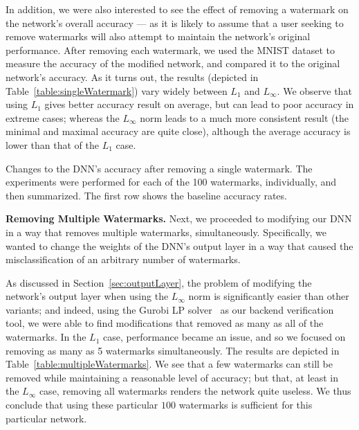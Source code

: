 \documentclass{easychair}
\begin{document}
In addition, we were also interested to see the effect of removing a
watermark on the network's overall accuracy --- as it is likely to
assume that a user seeking to remove watermarks will also attempt to
maintain the network's original performance. After removing each
watermark, we used the MNIST dataset to measure the accuracy of the
modified network, and compared it to the original network's accuracy. As it turns out, the
results (depicted in Table~\ref{table:singleWatermark})
vary widely between $L_1$ and $L_\infty$. We observe that using 
$L_1$ gives better accuracy result on average, but can lead to poor
accuracy in extreme cases; whereas the $L_\infty$ norm leads to a much
more consistent result (the minimal and maximal
accuracy are quite close), although the average accuracy is lower than
that of the $L_1$ case. 

\begin{table}
\caption{Changes to the DNN's accuracy after removing a single
  watermark. The experiments were performed for each of the
  100 watermarks, individually, and then summarized. The first row
  shows the baseline accuracy rates.}
\label{table:singleWatermark}
\end{table}

\medskip\noindent \textbf{Removing Multiple Watermarks.}
Next, we proceeded to modifying our DNN in a way that
removes multiple watermarks, simultaneously. Specifically, we wanted
to change the weights of the DNN's output layer in a way that caused
the misclassification of an arbitrary number of watermarks.

As discussed in Section~\ref{sec:outputLayer}, the problem of modifying the network's
output layer when using the $L_\infty$ norm is significantly easier
than other variants; and indeed, using the Gurobi LP solver~\cite{gurobi} as our backend
verification tool, we were able to find modifications
that removed as many as all of the watermarks. In the $L_1$ case,
performance became an issue, and so we focused on removing as many as
5 watermarks simultaneously. The results are depicted in
Table~\ref{table:multipleWatermarks}. We see that a few watermarks can
still be removed while maintaining a reasonable level of accuracy; but
that, at least in the $L_\infty$ case, removing all watermarks renders
the network quite useless. We thus conclude that using these particular $100$
watermarks is sufficient for this particular network.
\end{document}
